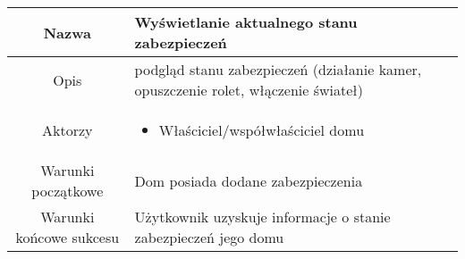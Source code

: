 \documentclass{article}
\begin{document}
\begin{enumerate}
\begin{enumerate}
				\begin{table}[H]
					\centering
					\begin{tabular}{|c|p{7cm}|}
						\hline
						Nazwa                   & \textbf{Wyświetlanie aktualnego stanu zabezpieczeń}                                                                                                                                                                                                                                                                                                                                                                                                              \\
						\hline
						Opis                    & podgląd stanu zabezpieczeń (działanie kamer, opuszczenie rolet, włączenie świateł)                                                                                                                                                                                                                                                                                                                                                                               \\
						\hline
						Aktorzy                 & \begin{itemize}\item Właściciel/współwłaściciel domu\end{itemize}                                                                                                                                                                                                                                                                                                                                                                                                \\
						\hline
						Warunki początkowe      & Dom posiada dodane zabezpieczenia                                                                                                                                                                                                                                                                                                                                                                                                                                \\
						\hline
						Warunki końcowe sukcesu & Użytkownik uzyskuje informacje o stanie zabezpieczeń jego domu                                                                                                                                                                                                                                                                                                                                                                                                   \\

\end{tabular}
\end{table}
\end{enumerate}
\end{enumerate}
\end{document}
